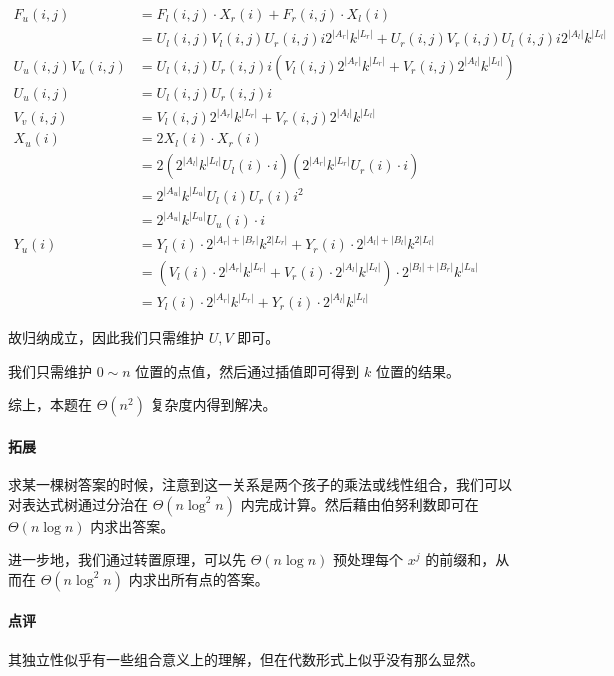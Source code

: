 \documentclass[12pt]{ctexart}
\theoremstyle{theorem}
\theoremstyle{theorem}
\begin{document}
$$
\begin{aligned}
F_u(i,j) &= F_l(i,j) \cdot X_r(i) + F_r(i,j) \cdot X_l(i)\\
&= U_l(i,j)V_l(i,j)U_r(i,j)i 2^{|A_r|} k^{|L_r|} +U_r(i,j)V_r(i,j)U_l(i,j)i 2^{|A_l|} k^{|L_l|}\\
U_u(i,j)V_u(i,j)&= U_l(i,j)U_r(i,j) i\left( V_l(i,j) 2^{|A_r|} k^{|L_r|}+ V_r(i,j) 2^{|A_l|} k^{|L_l|} \right)\\
U_u(i,j)&=U_l(i,j)U_r(i,j) i\\
V_v(i,j)&=V_l(i,j) 2^{|A_r|} k^{|L_r|}+ V_r(i,j) 2^{|A_l|} k^{|L_l|}\\
X_u(i)&=2 X_l(i)\cdot X_r(i)\\
&=2 \left(2^{|A_l|} k^{|L_l|} U_l(i)\cdot i\right) \left(2^{|A_r|} k^{|L_r|} U_r(i)\cdot i\right)\\
&=2^{|A_u|}k^{|L_u|} U_l(i)U_r(i)i^2\\
&=2^{|A_u|}k^{|L_u|} U_u(i)\cdot i\\
Y_u(i)&= Y_l(i) \cdot 2^{|A_r|+|B_r|}k^{2|L_r|} + Y_r(i) \cdot 2^{|A_l|+|B_l|}k^{2|L_l|}\\
&= \left( V_l(i) \cdot 2^{|A_r|}k^{|L_r|} + V_r(i) \cdot 2^{|A_l|}k^{|L_l|} \right)\cdot 2^{|B_l|+|B_r|} k^{|L_u|}\\
&= Y_l(i) \cdot 2^{|A_r|}k^{|L_r|} + Y_r(i) \cdot 2^{|A_l|}k^{|L_l|} 
\end{aligned}
$$

故归纳成立，因此我们只需维护 $U,V$ 即可。

我们只需维护 $0\sim n$ 位置的点值，然后通过插值即可得到 $k$ 位置的结果。

综上，本题在 $\Theta(n^2)$ 复杂度内得到解决。

\paragraph{拓展} 求某一棵树答案的时候，注意到这一关系是两个孩子的乘法或线性组合，我们可以对表达式树通过分治在 $\Theta(n\log ^2 n)$ 内完成计算。然后藉由伯努利数即可在 $\Theta(n\log n)$ 内求出答案。

进一步地，我们通过转置原理，可以先 $\Theta(n\log n)$ 预处理每个 $x^j$ 的前缀和，从而在 $\Theta(n\log^2n)$ 内求出所有点的答案。

\paragraph{点评} 其独立性似乎有一些组合意义上的理解，但在代数形式上似乎没有那么显然。

\newpage
\end{document}
